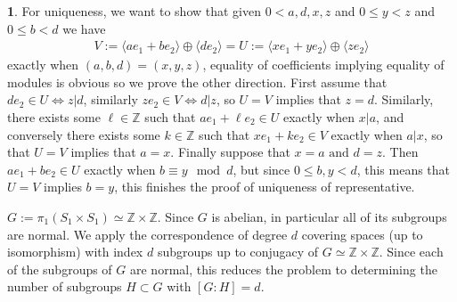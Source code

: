 \documentclass[10.5pt]{article}
\theoremstyle{definition}
\newtheorem{pb}{}
\newcommand{\gen}[1]{\langle #1 \rangle}
\newcommand{\tand}{\text{ and }}
\begin{document}
\begin{pb}
        For uniqueness, we want to show that given \(0 < a,d,x,z\) and \(0 \leq y < z\) and \(0 \leq b < d\) we have
        \begin{align*}
            V := \gen{ae_1 + be_2}\oplus\gen{de_2} = U := \gen{xe_1 + ye_2}\oplus\gen{ze_2}
        \end{align*}
        exactly when \((a,b,d) = (x,y,z)\), equality of coefficients implying equality of modules is obvious so we prove the other direction. First assume that \(d e_2 \in U \iff z \vert d\), similarly \(z e_2 \in V \iff d \vert z\), so \(U = V\) implies that \(z = d\). Similarly, there exists some \(\ell \in \mathbb{Z}\) such that \(ae_1 + \ell e_2 \in U\) exactly when \(x \vert a\), and conversely there exists some \(k \in \mathbb{Z}\) such that \(xe_1 + ke_2 \in V\) exactly when \(a \vert x\), so that \(U = V\) implies that \(a = x\). Finally suppose that \(x = a \tand d = z\). Then \(ae_1 + be_2 \in U\) exactly when \(b \equiv y \mod d\), but since \(0 \leq b,y < d\), this means that \(U = V\) implies \(b = y\), this finishes the proof of uniqueness of representative.
        \newline

        \(G := \pi_1(S_1 \times S_1) \simeq \mathbb{Z} \times \mathbb{Z}\). Since \(G\) is abelian, in particular all of its subgroups are normal. We apply the correspondence of degree \(d\) covering spaces (up to isomorphism) with index \(d\) subgroups up to conjugacy of \(G \simeq \mathbb{Z} \times \mathbb{Z}\). Since each of the subgroups of \(G\) are normal, this reduces the problem to determining the number of subgroups \(H \subset G\) with \([G:H] = d\).


\end{pb}
\end{document}
